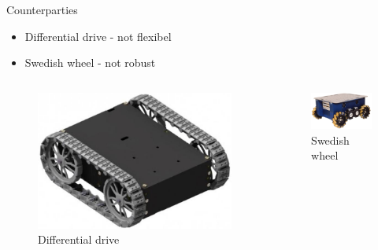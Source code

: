 \documentclass[10pt]{beamer}
\begin{document}
\begin{frame}{Counterparties}
    \begin{itemize}
        \item Differential drive - not flexibel
        \item Swedish wheel - not robust
    \end{itemize}
    \begin{columns}
      \begin{figure}
          \centering
          \includegraphics[width=\textwidth]{Figure/tank.jpeg}
          \caption{Differential drive}
          \label{fig:my_label}
      \end{figure}
      
      \begin{figure}
          \centering
          \includegraphics[width=\textwidth]{Figure/swedish.png}
          \caption{Swedish wheel}
          \label{fig:my_label}
      \end{figure}
    \end{columns}
\end{frame}
\end{document}
